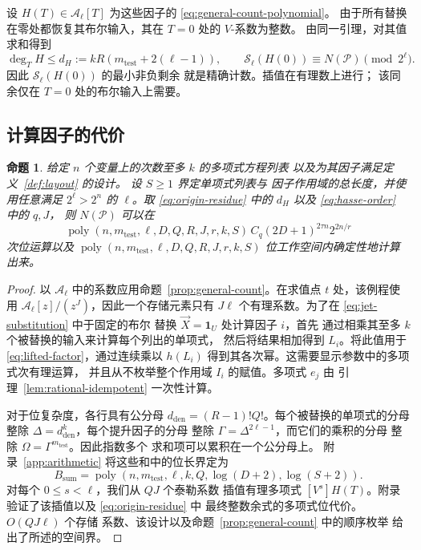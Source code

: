 \documentclass[11pt,reqno]{amsart}
\numberwithin{equation}{section}
\newtheorem{proposition}[theorem]{命题}
\theoremstyle{definition}\newtheorem{definition}[theorem]{定义}
\theoremstyle{remark}\newtheorem{remark}[theorem]{注}
\newcommand{\poly}{\operatorname{poly}}
\renewcommand{\le}{\leqslant}
\renewcommand{\ge}{\geqslant}
\begin{document}
设 $H(T)\in\mathcal A_\ell[T]$ 为这些因子的 \eqref{eq:general-count-polynomial}。
由于所有替换在零处都恢复其布尔输入，其在 $T=0$ 处的 $V$-系数为整数。
由同一引理，对其值求和得到
\begin{equation}\label{eq:origin-residue}
 \deg_T H\le d_H:=kR(m_{\mathrm{test}}+2(\ell-1)),\qquad
 \mathcal S_\ell(H(0))\equiv N(\mathcal P)\pmod{2^\ell}.
\end{equation}
因此 $\mathcal S_\ell(H(0))$ 的最小非负剩余
就是精确计数。插值在有理数上进行；
该同余仅在 $T=0$ 处的布尔输入上需要。

\subsection{计算因子的代价}\label{subsec:one-query-cost}
\begin{proposition}\label{prop:count}
给定 $n$ 个变量上的次数至多 $k$ 的多项式方程列表
以及为其因子满足定义~\ref{def:layout} 的设计。
设 $S\ge1$ 界定单项式列表与
因子作用域的总长度，并使用任意满足 $2^\ell>2^n$ 的 $\ell$。取
\eqref{eq:origin-residue} 中的 $d_H$ 以及 \eqref{eq:hasse-order} 中的 $q,J$，
则 $N(\mathcal P)$ 可以在
\[
 \poly(n,m_{\mathrm{test}},\ell,D,Q,R,J,r,k,S)\,
 C_q(2D+1)^{2\tau n}2^{2n/r}
\]
次位运算以及 $\poly(n,m_{\mathrm{test}},\ell,D,Q,R,J,r,k,S)$
位工作空间内确定性地计算出来。
\end{proposition}
\begin{proof}
以 $\mathcal A_\ell$ 中的系数应用命题~\ref{prop:general-count}。在求值点 $t$ 处，该例程使用
$\mathcal A_\ell[z]/(z^J)$，因此一个存储元素只有 $J\ell$
个有理系数。为了在 \eqref{eq:jet-substitution} 中于固定的布尔
替换 $\vec X=\mathbf1_U$ 处计算因子 $i$，首先
通过相乘其至多 $k$ 个被替换的输入来计算每个列出的单项式，
然后将结果相加得到 $L_i$。将此值用于
\eqref{eq:lifted-factor}，通过连续乘以 $h(L_i)$
得到其各次幂。这需要显示参数中的多项式次有理运算，
并且从不枚举整个作用域 $I_i$ 的赋值。多项式 $e_j$ 由
引理~\ref{lem:rational-idempotent} 一次性计算。

对于位复杂度，各行具有公分母
$d_{\mathrm{den}}=(R-1)!Q!$。每个被替换的单项式的分母
整除 $\Delta=d_{\mathrm{den}}^k$，每个提升因子的分母
整除 $\Gamma=\Delta^{2\ell-1}$，而它们的乘积的分母
整除 $\Omega=\Gamma^{m_{\mathrm{test}}}$。因此指数多个
求和项可以累积在一个公分母上。
附录~\ref{app:arithmetic} 将这些和中的位长界定为
\begin{equation}\label{eq:sum-bit-bound}
 B_{\mathrm{sum}}=\poly(n,m_{\mathrm{test}},\ell,k,Q,\log(D+2),\log(S+2)).
\end{equation}
对每个 $0\le s<\ell$，我们从 $QJ$ 个泰勒系数
插值有理多项式 $[V^s]H(T)$。附录验证了该插值以及 \eqref{eq:origin-residue} 中
最终整数余式的多项式位代价。$O(QJ\ell)$ 个存储
系数、该设计以及命题~\ref{prop:general-count} 中的顺序枚举
给出了所述的空间界。
\end{proof}
\end{document}
